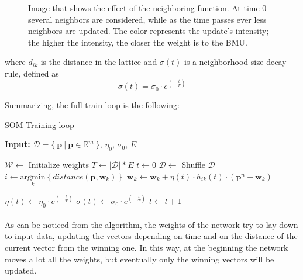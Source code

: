 \begin{figure}[h]
    \centering
    
    \caption{Image that shows the effect of the neighboring function. At time 0 several neighbors are considered, while as the time passes ever less neighbors are updated. The color represents the update's intensity; the higher the intensity, the closer the weight is to the BMU.}
\end{figure}

where $d_{ik}$ is the distance in the lattice and $\sigma(t)$ is a neighborhood size decay rule, defined as
\[
    \sigma(t) = \sigma_0 \cdot e^{\displaystyle \left ( -\frac{t}{T} \right )}
\]

Summarizing, the full train loop is the following:
\begin{algorithm}[h!]
    \caption{SOM Training loop}
    \label{alg:cap}
    \textbf{Input:}  $\mathcal{D} = \{\ \textbf{p}\ |\ \textbf{p} \in \mathbb{R}^m\ \}$, $\eta_0$, $\sigma_0$, $E$ 
    \begin{algorithmic}[1]
        \State $\mathcal{W} \gets $ Initialize weights
        \State $T \gets |\mathcal{D}| * E$
        \State $t \gets 0$
            \State $\mathcal{D} \gets $ Shuffle $\mathcal{D}$
                \State $i \gets \underset{k}{\mathrm{argmin}} \left \{ distance(\textbf{p}, \textbf{w}_k) \right \}$
                    \State $\textbf{w}_k \gets \textbf{w}_k + \eta(t) \cdot h_{ik}(t) \cdot (\textbf{p}^n - \textbf{w}_k)$
                \EndFor
                    
                \State $\eta(t) \gets \eta_0 \cdot e^{( -\frac{t}{T})}$
                \State $\sigma(t) \gets \sigma_0 \cdot e^{( -\frac{t}{T})}$
                \State $t \gets t + 1$
            \EndFor
        \EndWhile
    \end{algorithmic}
\end{algorithm}

\paragraph{}
As can be noticed from the algorithm, the weights of the network try to lay down to input data, updating the vectors depending on time and on the distance of the current vector from the winning one. In this way, at the beginning the network moves a lot all the weights, but eventually only the winning vectors will be updated.

